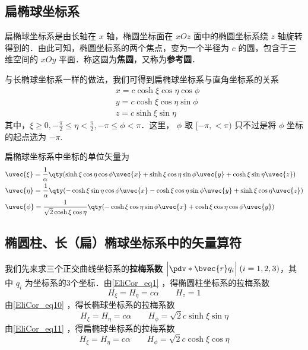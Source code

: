 \subsection{扁椭球坐标系}
扁椭球坐标系是由长轴在 $x$ 轴，椭圆坐标面在 $xOz$ 面中的椭圆坐标系绕 $z$ 轴旋转得到的．由此可知，椭圆坐标系的两个焦点，变为一个半径为 $c$ 的圆，包含于三维空间的 $xOy$ 平面．称这圆为\textbf{焦圆}，又称为\textbf{参考圆}．

与长椭球坐标系一样的做法，我们可得到扁椭球坐标系与直角坐标系的关系
\begin{equation}\label{EliCor_eq11}
\begin{aligned}
&x=c\cosh\xi\cos\eta\cos\phi\\
&y=c\cosh\xi\cos\eta\sin\phi\\
&z=c\sinh\xi\sin\eta
\end{aligned}
\end{equation}
其中，$\xi\geq 0,-\frac{\pi}{2}\leq\eta<\frac{\pi}{2},-\pi\leq\phi<\pi$．这里， $\phi$ 取 $[-\pi,<\pi)$ 只不过是将 $\phi$ 坐标的起点选为 $-\pi$.

扁椭球坐标系中坐标的单位矢量为
\begin{equation}
\begin{aligned}
&\uvec{\xi}=\frac{1}{\alpha}\qty(\sinh\xi\cos\eta\cos\phi\uvec{x}+\sinh\xi\cos\eta\sin\phi\uvec{y}+\cosh\xi\sin\eta\uvec{z})\\
&\uvec{\eta}=\frac{1}{\alpha}\qty(-\cosh\xi\sin\eta\cos\phi\uvec{x}-\cosh\xi\cos\eta\sin\phi\uvec{y}+\sinh\xi\cos\eta\uvec{z})\\
&\uvec{\phi}=\frac{1}{\sqrt{2}\cosh\xi\cos\eta}\qty(-\cosh\xi\cos\eta\sin\phi\uvec{x}+\cosh\xi\cos\eta\cos\phi\uvec{y})
\end{aligned}
\end{equation}

\subsection{椭圆柱、长（扁）椭球坐标系中的矢量算符}
我们先来求三个正交曲线坐标系的\textbf{拉梅系数} $\Big|\pdv*{\bvec{r}}{q_i}\Big|\;(i=1,2,3)$，其中 $q_i$ 为坐标系的3个坐标．由\autoref{EliCor_eq1} ，得椭圆柱坐标系的拉梅系数
\begin{equation}
H_\xi=H_\eta=c\alpha \quad \quad H_z=1
\end{equation}
由\autoref{EliCor_eq10} ，得长椭球坐标系的拉梅系数
\begin{equation}
H_\xi=H_\eta=c\alpha \quad \quad H_\phi=\sqrt{2}c\sinh\xi\sin\eta
\end{equation}
由\autoref{EliCor_eq11} ，得扁椭球坐标系的拉梅系数
\begin{equation}
H_\xi=H_\eta=c\alpha \quad \quad H_\phi=\sqrt{2}c\cosh\xi\cos\eta
\end{equation}
